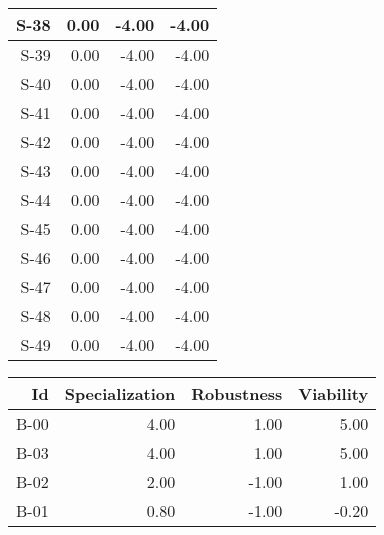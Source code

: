 \begin{tabular}{ | r | r | r | r | }
    \hline
                  S-38  &            0.00  &           -4.00  &           -4.00  \\
    \hline
                  S-39  &            0.00  &           -4.00  &           -4.00  \\
    \hline
                  S-40  &            0.00  &           -4.00  &           -4.00  \\
    \hline
                  S-41  &            0.00  &           -4.00  &           -4.00  \\
    \hline
                  S-42  &            0.00  &           -4.00  &           -4.00  \\
    \hline
                  S-43  &            0.00  &           -4.00  &           -4.00  \\
    \hline
                  S-44  &            0.00  &           -4.00  &           -4.00  \\
    \hline
                  S-45  &            0.00  &           -4.00  &           -4.00  \\
    \hline
                  S-46  &            0.00  &           -4.00  &           -4.00  \\
    \hline
                  S-47  &            0.00  &           -4.00  &           -4.00  \\
    \hline
                  S-48  &            0.00  &           -4.00  &           -4.00  \\
    \hline
                  S-49  &            0.00  &           -4.00  &           -4.00  \\
    \hline
\end{tabular}


\begin{tabular}{ | r | r | r | r | }
    \hline
                    Id  &  Specialization  &      Robustness  &       Viability  \\
    \hline
    \hline
                  B-00  &            4.00  &            1.00  &            5.00  \\
    \hline
                  B-03  &            4.00  &            1.00  &            5.00  \\
    \hline
                  B-02  &            2.00  &           -1.00  &            1.00  \\
    \hline
                  B-01  &            0.80  &           -1.00  &           -0.20  \\
    \hline
\end{tabular}



